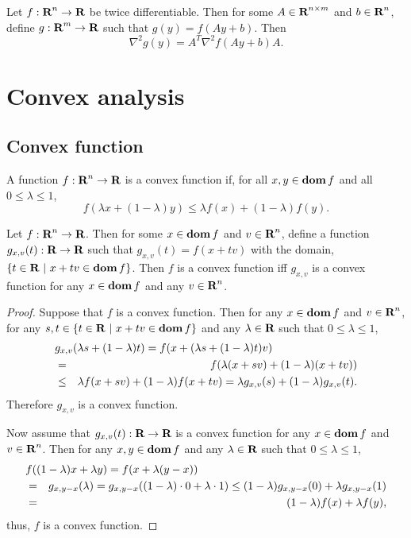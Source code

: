 \documentclass[10pt, twoside]{book}   	%
\begin{document}
\begin{corollary}
\label{corollary:eicg}
Let $f:{\mbox{\bf R}}^n\to{\mbox{\bf R}}$ be twice differentiable.
Then for some $A\in{\mbox{\bf R}}^{n\times m}$ and $b\in{\mbox{\bf R}}^n$,
define $g:{\mbox{\bf R}}^m\to{\mbox{\bf R}}$ such that $g(y) = f(Ay+b)$.
Then
\begin{equation}
\label{eq:eicg}
\nabla^2 g(y) = A^T \nabla^2 f(Ay+b)A.
\end{equation}
\end{corollary}


\chapter{Convex analysis}

\section{Convex function}

A function $f:{\mbox{\bf R}}^n\to{\mbox{\bf R}}$ is a convex function if, for all $x,y \in \mathop{\bf dom} f$ and all $0\leq \lambda \leq 1$,
\begin{equation}
f(\lambda x + (1-\lambda)y)
\leq
\lambda f(x) + (1-\lambda)f(y).
\end{equation}

\begin{theorem}
\label{theorem:cvx-equiv-1d-fcn}
Let $f:{\mbox{\bf R}}^n\to{\mbox{\bf R}}$.
Then for some $x\in\mathop{\bf dom} f$ and $v\in{\mbox{\bf R}}^n$,
define a function $g_{x,v}(t):{\mbox{\bf R}}\to{\mbox{\bf R}}$ such that $g_{x,v}(t) = f(x+tv)$
with the domain, $\{t\in{\mbox{\bf R}}~|~x+tv\in \mathop{\bf dom} f\}$.
Then $f$ is a convex function iff $g_{x,v}$ is a convex function for any $x\in\mathop{\bf dom} f$ and any $v\in{\mbox{\bf R}}^n$.
\end{theorem}

\begin{proof}
Suppose that $f$ is a convex function.
Then for any $x\in\mathop{\bf dom} f$ and $v\in{\mbox{\bf R}}^n$,
for any $s,t \in\{t\in{\mbox{\bf R}}~|~x+tv\in \mathop{\bf dom} f\}$ and any $\lambda\in{\mbox{\bf R}}$ such that $0\leq \lambda \leq 1$,
\begin{eqnarray*}
\lefteqn{
g_{x,v}(\lambda s + (1-\lambda) t)
=f(x+(\lambda s + (1-\lambda) t)v)
}
\\
&=&
f(\lambda (x+sv) + (1-\lambda) (x+tv))
\\
&\leq&
\lambda f(x+sv) + (1-\lambda) f(x+tv)
= \lambda g_{x,v}(s) + (1-\lambda) g_{x,v}(t).
\end{eqnarray*}
Therefore $g_{x,v}$ is a convex function.

Now assume that
$g_{x,v}(t):{\mbox{\bf R}}\to{\mbox{\bf R}}$ is a convex function for any $x\in\mathop{\bf dom} f$ and $v\in{\mbox{\bf R}}^n$.
Then for any $x,y \in \mathop{\bf dom} f$ and any $\lambda\in{\mbox{\bf R}}$ such that $0\leq \lambda \leq 1$,
\begin{eqnarray*}
\lefteqn{
f((1-\lambda) x + \lambda y ) =f(x + \lambda (y-x) )
}
\\
&=&
g_{x,y-x}(\lambda)
= g_{x,y-x}((1-\lambda)\cdot 0 + \lambda \cdot 1)
\leq (1-\lambda) g_{x,y-x}(0) + \lambda g_{x,y-x}(1)
\\
&=&
(1-\lambda) f(x) + \lambda f(y),
\end{eqnarray*}
thus, $f$ is a convex function.
\end{proof}
\end{document}
